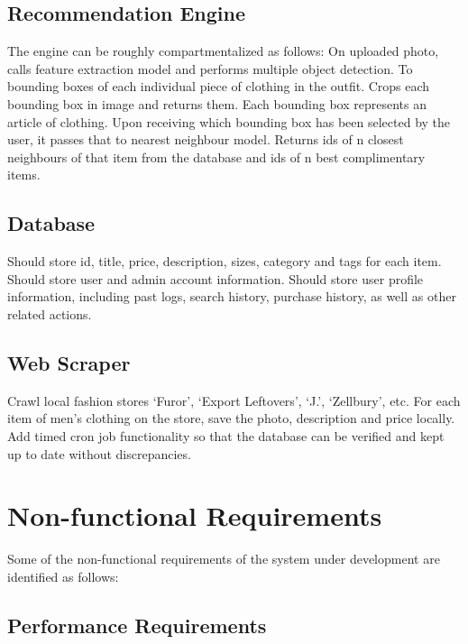 \begin{outline}
  \subsection{Recommendation Engine}
  The engine can be roughly compartmentalized as follows:
  \1 On uploaded photo, calls feature extraction model and performs multiple object detection. To bounding boxes of each individual piece of clothing in the outfit.
  \1 Crops each bounding box in image and returns them. Each bounding box represents an article of clothing.
  \1 Upon receiving which bounding box has been selected by the user, it passes that to nearest neighbour model. Returns ids of n closest neighbours of that item from the database and ids of n best complimentary items.
\end{outline}
\begin{outline}
  \subsection{Database}
  \1 Should store id, title, price, description, sizes, category and tags for each item.
  \1 Should store user and admin account information.
  \1 Should store user profile information, including past logs, search history, purchase history, as well as other related actions.
\end{outline}
\begin{outline}
  \subsection{Web Scraper}
  \1 Crawl local fashion stores `Furor', `Export Leftovers', `J.', `Zellbury', etc.
  \1 For each item of men's clothing on the store, save the photo, description and price locally.
  \1 Add timed cron job functionality so that the database can be verified and kept up to date without discrepancies.
\end{outline}

\section{Non-functional Requirements}
Some of the non-functional requirements of the system under development are identified as follows:
\subsection{Performance Requirements}

